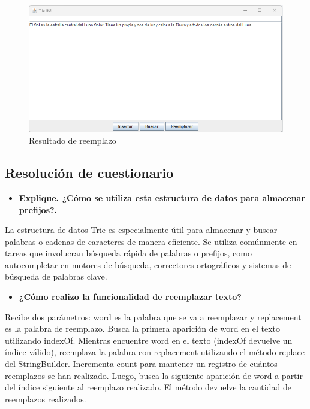 \documentclass{article}
\begin{document}
 \clearpage
   \begin{figure}[H]
       \centering
       \includegraphics[scale=0.79]{img/img21.png}
       \caption{Resultado de reemplazo}
       \label{fig:enter-label}
 \end{figure}
\clearpage


\subsection{Resolución de cuestionario}
 \begin{itemize}
     \item \textbf{Explique. ¿Cómo se utiliza esta estructura de datos para almacenar prefijos?.}
 \end{itemize}
 \newline
 La estructura de datos Trie es especialmente útil para almacenar y buscar palabras o cadenas de caracteres de manera eficiente. Se utiliza comúnmente en tareas que involucran búsqueda rápida de palabras o prefijos, como autocompletar en motores de búsqueda, correctores ortográficos y sistemas de búsqueda de palabras clave.
\begin{itemize}
     \item \textbf{¿Cómo realizo la funcionalidad de reemplazar texto?}
 \end{itemize}
 \newline
Recibe dos parámetros: word es la palabra que se va a reemplazar y replacement es la palabra de reemplazo. Busca la primera aparición de word en el texto utilizando indexOf. Mientras encuentre word en el texto (indexOf devuelve un índice válido), reemplaza la palabra con replacement utilizando el método replace del StringBuilder. Incrementa count para mantener un registro de cuántos reemplazos se han realizado. Luego, busca la siguiente aparición de word a partir del índice siguiente al reemplazo realizado. El método devuelve la cantidad de reemplazos realizados.	
\end{document}
